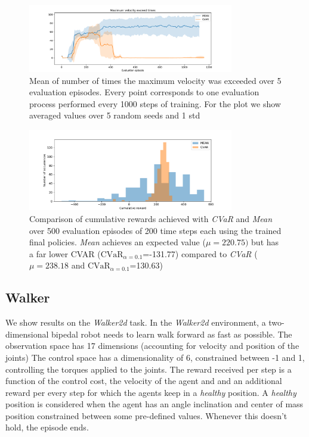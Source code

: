 \begin{figure}[ht]
    \centering
    \includegraphics[width=0.8\textwidth]{images/Cheetah_offpolicy_medium/times_exceedvel_withstds.pdf}
    \caption{Mean of number of times the maximum velocity was exceeded over 5 evaluation episodes.
    Every point corresponds to one evaluation process performed every 1000 steps of training.
    For the plot we show averaged values over 5 random seeds and 1 std}
    \label{vel_exceed_cheetah}

\end{figure}

\begin{figure}[ht]
    \centering
    \includegraphics[width=0.8\textwidth]{images/Cheetah_offpolicy_medium/hist_evaluation_numevalsteps200_500eps.pdf}
    \caption{Comparison of cumulative rewards achieved with \textit{CVaR} and \textit{Mean}
    over 500 evaluation episodes of 200 time steps each using the trained final policies.
    \textit{Mean} achieves an expected value  ($\mu=220.75)$  but 
    has a far lower CVAR ($\text{CVaR}_{\alpha= 0.1}$=-131.77) compared to
    \textit{CVaR} ($\mu=238.18$ and $\text{CVaR}_{\alpha= 0.1}$=130.63)}
    \label{hist_cum_rewards200steps_cheetah}
\end{figure}

\clearpage

\subsection{Walker}

We show results on the \textit{Walker2d} task.
In the \textit{Walker2d} environment, a two-dimensional bipedal robot needs to learn walk forward
as fast as possible.
The observation space has 17 dimensions (accounting for velocity and position of the joints)
The control space has a dimensionality of 6, constrained between -1 and 1, 
controlling the torques applied to the joints.
The reward received per step is a function of the control cost, the velocity of the agent and 
and an additional reward per every step for which the agents keep in a \textit{healthy} position.
A \textit{healthy} position is considered when the agent has an angle inclination and center of mass
position constrained between some pre-defined values. Whenever this doesn't hold, the episode ends.

